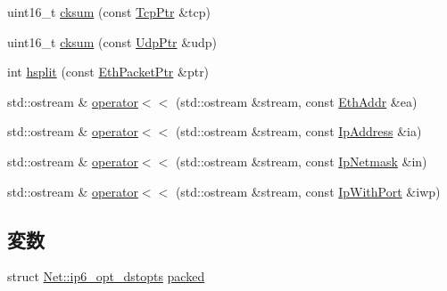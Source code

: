 \begin{DoxyCompactItemize}
\item 
uint16\_\-t \hyperlink{namespaceNet_a6ccfd763e7871d9d574f28105e9d9741}{cksum} (const \hyperlink{classNet_1_1TcpPtr}{TcpPtr} \&tcp)
\item 
uint16\_\-t \hyperlink{namespaceNet_a28dfbc35e8046118e0f49a89a57a717a}{cksum} (const \hyperlink{classNet_1_1UdpPtr}{UdpPtr} \&udp)
\item 
int \hyperlink{namespaceNet_a7e50a230aeed27f50f5dd05a5768c74c}{hsplit} (const \hyperlink{classRefCountingPtr}{EthPacketPtr} \&ptr)
\item 
std::ostream \& \hyperlink{namespaceNet_a33cc7c79cf286230e0e24e91f5e9538d}{operator$<$$<$} (std::ostream \&stream, const \hyperlink{structNet_1_1EthAddr}{EthAddr} \&ea)
\item 
std::ostream \& \hyperlink{namespaceNet_a2949e3b1ccefd2ea4bf18bdbac77a27d}{operator$<$$<$} (std::ostream \&stream, const \hyperlink{structNet_1_1IpAddress}{IpAddress} \&ia)
\item 
std::ostream \& \hyperlink{namespaceNet_a74553ce1b89582d6984b297ff67e1e20}{operator$<$$<$} (std::ostream \&stream, const \hyperlink{structNet_1_1IpNetmask}{IpNetmask} \&in)
\item 
std::ostream \& \hyperlink{namespaceNet_a767c129a825fcade7c84662752bc7696}{operator$<$$<$} (std::ostream \&stream, const \hyperlink{structNet_1_1IpWithPort}{IpWithPort} \&iwp)
\end{DoxyCompactItemize}
\subsection*{変数}
\begin{DoxyCompactItemize}
\item 
struct \hyperlink{structNet_1_1ip6__opt__dstopts}{Net::ip6\_\-opt\_\-dstopts} \hyperlink{namespaceNet_a4bfa83470dbd48cb568b3c42fdf1e48d}{packed}
\end{DoxyCompactItemize}



